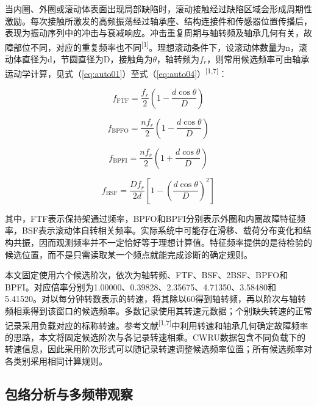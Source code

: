 \documentclass[UTF8,12pt,openany,twoside]{ctexbook}
\numberwithin{equation}{chapter}
\begin{document}
当内圈、外圈或滚动体表面出现局部缺陷时，滚动接触经过缺陷区域会形成周期性激励。每次接触所激发的高频振荡经过轴承座、结构连接件和传感器位置传播后，表现为振动序列中的冲击与衰减响应。冲击重复周期与轴转频及轴承几何有关，故障部位不同，对应的重复频率也不同\textsuperscript{[1]}。理想滚动条件下，设滚动体数量为n，滚动体直径为d，节圆直径为D，接触角为\ensuremath{\theta}，轴转频为$f_{r}$，则常用候选频率可由轴承运动学计算，见式（\ref{eq:auto01}）至式（\ref{eq:auto04}）\textsuperscript{[1,7]}：

\begin{equation}
\label{eq:auto01}
f_{\mathrm{FTF}}=\frac{f_r}{2}\left(1-\frac{d\cos\theta}{D}\right)
\end{equation}


\begin{equation}
\label{eq:auto02}
f_{\mathrm{BPFO}}=\frac{nf_r}{2}\left(1-\frac{d\cos\theta}{D}\right)
\end{equation}


\begin{equation}
\label{eq:auto03}
f_{\mathrm{BPFI}}=\frac{nf_r}{2}\left(1+\frac{d\cos\theta}{D}\right)
\end{equation}


\begin{equation}
\label{eq:auto04}
f_{\mathrm{BSF}}=\frac{Df_r}{2d}\left[1-\left(\frac{d\cos\theta}{D}\right)^2\right]
\end{equation}


其中，FTF表示保持架通过频率，BPFO和BPFI分别表示外圈和内圈故障特征频率，BSF表示滚动体自转相关频率。实际系统中可能存在滑移、载荷分布变化和结构共振，因而观测频率并不一定恰好等于理想计算值。特征频率提供的是待检验的候选位置，而不是只需读取某一个频点就能完成诊断的确定规则。

本文固定使用六个候选阶次，依次为轴转频、FTF、BSF、2BSF、BPFO和BPFI。对应倍率分别为1.00000、0.39828、2.35675、4.71350、3.58480和5.41520。对以每分钟转数表示的转速，将其除以60得到轴转频，再以阶次与轴转频相乘得到该窗口的候选频率。多数记录使用其转速元数据；个别缺失转速的正常记录采用负载对应的标称转速。参考文献\textsuperscript{[1,7]}中利用转速和轴承几何确定故障频率的思路，本文将固定候选阶次与各记录转速相乘。CWRU数据包含不同负载下的转速信息，因此采用阶次形式可以随记录转速调整候选频率位置；所有候选频率对各类别采用相同计算规则。

\subsection{包络分析与多频带观察}\label{ux5305ux7edcux5206ux6790ux4e0eux591aux9891ux5e26ux89c2ux5bdf}
\end{document}
